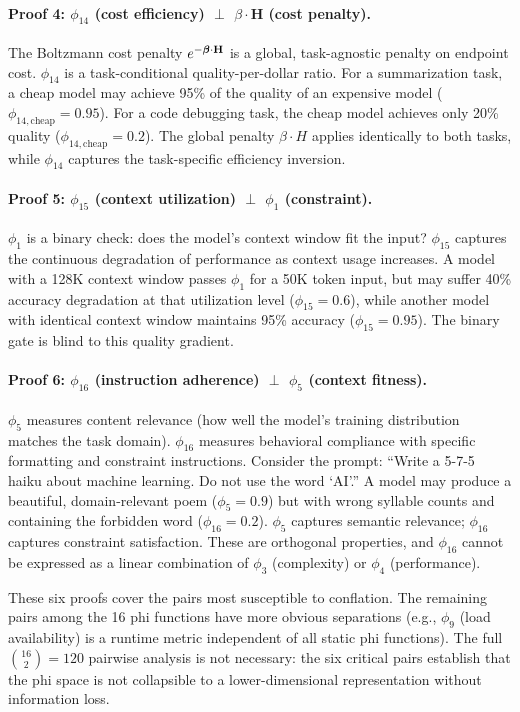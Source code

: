\paragraph{Proof 4: $\phi_{14}$ (cost efficiency) $\perp$ $\beta \cdot \mathbf{H}$ (cost penalty).}
The Boltzmann cost penalty $e^{-\boldsymbol{\beta} \cdot \mathbf{H}}$ is a global, task-agnostic penalty on endpoint cost. $\phi_{14}$ is a task-conditional quality-per-dollar ratio. For a summarization task, a cheap model may achieve 95\% of the quality of an expensive model ($\phi_{14,\text{cheap}} = 0.95$). For a code debugging task, the cheap model achieves only 20\% quality ($\phi_{14,\text{cheap}} = 0.2$). The global penalty $\beta \cdot H$ applies identically to both tasks, while $\phi_{14}$ captures the task-specific efficiency inversion.

\paragraph{Proof 5: $\phi_{15}$ (context utilization) $\perp$ $\phi_1$ (constraint).}
$\phi_1$ is a binary check: does the model's context window fit the input? $\phi_{15}$ captures the continuous degradation of performance as context usage increases. A model with a 128K context window passes $\phi_1$ for a 50K token input, but may suffer 40\% accuracy degradation at that utilization level ($\phi_{15} = 0.6$), while another model with identical context window maintains 95\% accuracy ($\phi_{15} = 0.95$). The binary gate is blind to this quality gradient.

\paragraph{Proof 6: $\phi_{16}$ (instruction adherence) $\perp$ $\phi_5$ (context fitness).}
$\phi_5$ measures content relevance (how well the model's training distribution matches the task domain). $\phi_{16}$ measures behavioral compliance with specific formatting and constraint instructions. Consider the prompt: ``Write a 5-7-5 haiku about machine learning. Do not use the word `AI'.'' A model may produce a beautiful, domain-relevant poem ($\phi_5 = 0.9$) but with wrong syllable counts and containing the forbidden word ($\phi_{16} = 0.2$). $\phi_5$ captures semantic relevance; $\phi_{16}$ captures constraint satisfaction. These are orthogonal properties, and $\phi_{16}$ cannot be expressed as a linear combination of $\phi_3$ (complexity) or $\phi_4$ (performance).

\begin{remark}
These six proofs cover the pairs most susceptible to conflation. The remaining pairs among the 16 phi functions have more obvious separations (e.g., $\phi_9$ (load availability) is a runtime metric independent of all static phi functions). The full $\binom{16}{2} = 120$ pairwise analysis is not necessary: the six critical pairs establish that the phi space is not collapsible to a lower-dimensional representation without information loss.
\end{remark}


